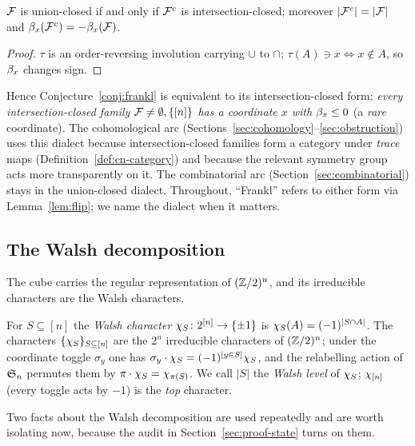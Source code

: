 \begin{lemma}
\label{lem:flip}
$\mathcal{F}$ is union-closed if and only if $\mathcal{F}^c$ is intersection-closed;
moreover $|\mathcal{F}^c|=|\mathcal{F}|$ and $\beta_x(\mathcal{F}^c)=-\beta_x(\mathcal{F})$.
\end{lemma}

\begin{proof}
$\tau$ is an order-reversing involution carrying $\cup$ to $\cap$;
$\tau(A)\ni x\iff x\notin A$, so $\beta_x$ changes sign.
\end{proof}

Hence Conjecture~\ref{conj:frankl} is equivalent to its
intersection-closed form: \emph{every intersection-closed family
$\mathcal{F}\neq\emptyset,\{[n]\}$ has a coordinate $x$ with $\beta_x\le0$}
(a \emph{rare} coordinate). The cohomological arc
(Sections~\ref{sec:cohomology}--\ref{sec:obstruction}) uses this
dialect because intersection-closed families form a category under
\emph{trace} maps (Definition~\ref{def:cn-category}) and because the
relevant symmetry group acts more transparently on it. The
combinatorial arc (Section~\ref{sec:combinatorial}) stays in the
union-closed dialect. Throughout, ``Frankl'' refers to either form via
Lemma~\ref{lem:flip}; we name the dialect when it matters.

\subsection{The Walsh decomposition}
\label{ssec:walsh}

The cube carries the regular representation of $(\mathbb{Z}/2)^n$, and its
irreducible characters are the Walsh characters.

\begin{definition}
\label{def:walsh}
For $S\subseteq[n]$ the \emph{Walsh character} $\chi_{S}\colon
2^{[n]}\to\{\pm1\}$ is $\chi_{S}(A)=(-1)^{|S\cap A|}$. The
characters $\{\chi_{S}\}_{S\subseteq[n]}$ are the $2^n$ irreducible
characters of $(\mathbb{Z}/2)^n$; under the coordinate toggle $\sigma_y$ one
has $\sigma_y\cdot\chi_{S}=(-1)^{[y\in S]}\chi_{S}$, and the
relabelling action of $\mathfrak{S}_n$ permutes them by
$\pi\cdot\chi_{S}=\chi_{\pi(S)}$. We call $|S|$ the \emph{Walsh level}
of $\chi_{S}$; $\chi_{[n]}$ (every toggle acts by $-1$) is the
\emph{top} character.
\end{definition}

Two facts about the Walsh decomposition are used repeatedly and are
worth isolating now, because the audit in Section~\ref{sec:proof-state}
turns on them.

